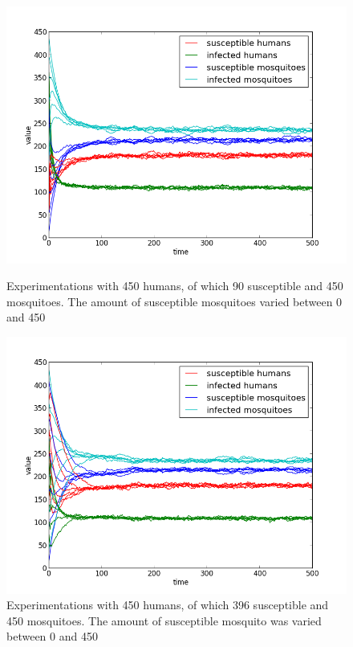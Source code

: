\documentclass[a4paper]{report}
\begin{document}
\begin{figure}[ht]
    \begin{minipage}[b]{0.8\linewidth} 
        \centering
        \includegraphics[scale=0.5]{var_mosquito_suscept_05_02_05_SECOND.png}
        \caption{Experimentations with 450 humans, of which 90 susceptible and 450
        mosquitoes. The amount of susceptible mosquitoes varied between 0 and
    450 }
        \label{fig:figure1}
    \end{minipage}
    \begin{minipage}[b]{0.8\linewidth}
        \centering
        \includegraphics[scale=0.5]{var_mosquito_suscept_05_08_05_SECOND.png}
        \caption{Experimentations with 450 humans, of which 396 susceptible and 450
        mosquitoes. The amount of susceptible mosquito was varied between 0 and
        450}
        \label{fig:figure2}
    \end{minipage}
\end{figure}
\end{document}

